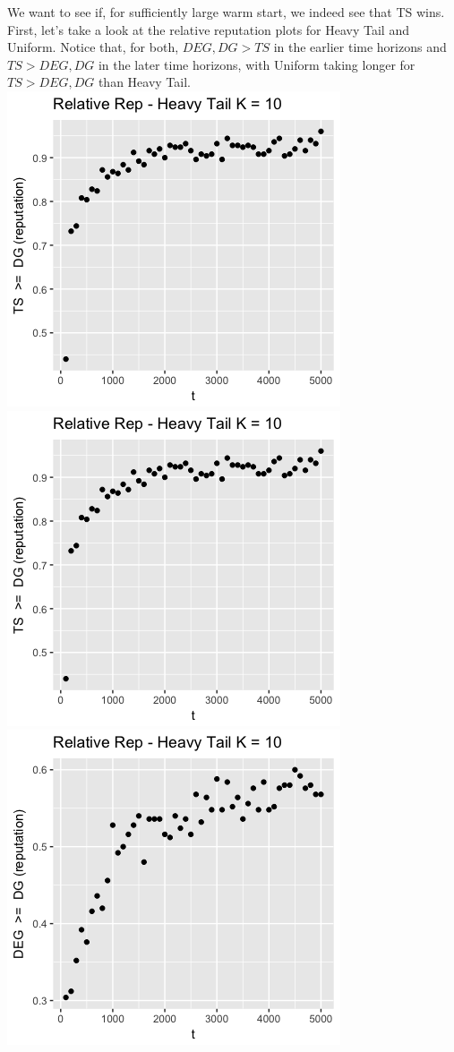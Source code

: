 \documentclass[11pt,letterpaper]{article}
\begin{document}
We want to see if, for sufficiently large warm start, we indeed see that TS wins. First, let's take a look at the relative reputation plots for Heavy Tail and Uniform. Notice that, for both, $DEG, DG > TS$ in the earlier time horizons and $TS > DEG, DG$ in the later time horizons, with Uniform taking longer for $TS > DEG, DG$ than Heavy Tail. \\

\includegraphics[scale=0.5]{ts_dg_ht_prelim_10} \\
\includegraphics[scale=0.5]{ts_deg_ht_10_prelim} \\
\includegraphics[scale=0.4]{deg_dg_ht_10_prelim} \\
\end{document}
